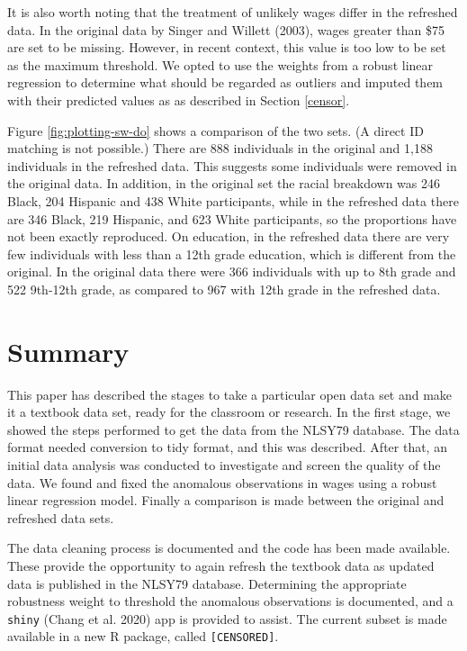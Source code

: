 \documentclass{article}
\begin{document}
It is also worth noting that the treatment of unlikely wages differ in the refreshed data. In the original data by Singer and Willett (2003), wages greater than \$75 are set to be missing. However, in recent context, this value is too low to be set as the maximum threshold. We opted to use the weights from a robust linear regression to determine what should be regarded as outliers and imputed them with their predicted values as as described in Section \ref{censor}.

Figure \ref{fig:plotting-sw-do} shows a comparison of the two sets. (A direct ID matching is not possible.) There are 888 individuals in the original and 1,188 individuals in the refreshed data. This suggests some individuals were removed in the original data.
In addition, in the original set the racial breakdown was 246 Black, 204 Hispanic and 438 White participants, while in the refreshed data there are 346 Black, 219 Hispanic, and 623 White participants, so the proportions have not been exactly reproduced. On education, in the refreshed data there are very few individuals with less than a 12th grade education, which is different from the original. In the original data there were 366 individuals with up to 8th grade and 522 9th-12th grade, as compared to 967 with 12th grade in the refreshed data.

\hypertarget{summary}{%
\section{Summary}\label{summary}}

This paper has described the stages to take a particular open data set and make it a textbook data set, ready for the classroom or research. In the first stage, we showed the steps performed to get the data from the NLSY79 database. The data format needed conversion to tidy format, and this was described. After that, an initial data analysis was conducted to investigate and screen the quality of the data. We found and fixed the anomalous observations in wages using a robust linear regression model. Finally a comparison is made between the original and refreshed data sets.

The data cleaning process is documented and the code has been made available. These provide the opportunity to again refresh the textbook data as updated data is published in the NLSY79 database.
Determining the appropriate robustness weight to threshold the anomalous observations is documented, and a \texttt{shiny} (Chang et al. 2020) app is provided to assist.
The current subset is made available in a new R package, called \texttt{[CENSORED]}.
\end{document}
